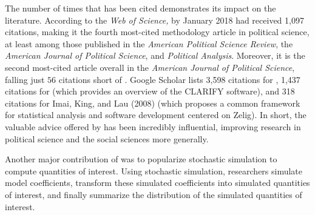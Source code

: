\documentclass[11pt]{article}
\begin{document}



The number of times that \cite{KingTomzWittenberg2000} has been cited demonstrates its impact on the literature. According to the {\it Web of Science,} by January 2018 \cite{KingTomzWittenberg2000} had received 1,097 citations, making it the fourth most-cited methodology article in political science, at least among those published in the \textit{American Political Science Review}, the \textit{American Journal of Political Science}, and \textit{Political Analysis}. Moreover, it is the second most-cited article overall in the \textit{American Journal of Political Science}, falling just $56$ citations short of \cite{BeckKatzTucker1998}. Google Scholar lists 3,598 citations for \cite{KingTomzWittenberg2000}, 1,437 citations for \cite{TomzWittenbergKing2003} (which provides an overview of the CLARIFY software), and 318 citations for Imai, King, and Lau (2008) (which proposes a common framework for statistical analysis and software development centered on Zelig). In short, the valuable advice offered by \cite{KingTomzWittenberg2000} has been incredibly influential, improving research in political science and the social sciences more generally.


Another major contribution of \cite{KingTomzWittenberg2000} was to popularize stochastic simulation to compute quantities of interest. Using stochastic simulation, researchers simulate model coefficients, transform these simulated coefficients into simulated quantities of interest, and finally summarize the distribution of the simulated quantities of interest.

\end{document}
